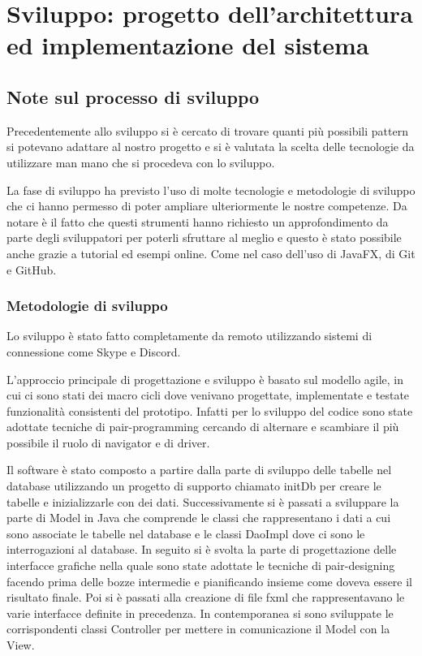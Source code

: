\documentclass{article}
\begin{document}
\newpage
\section{Sviluppo: progetto dell'architettura ed implementazione del sistema}
\subsection{Note sul processo di sviluppo}
Precedentemente allo sviluppo si è cercato di trovare quanti più possibili pattern si potevano adattare al nostro progetto e si è valutata la scelta delle tecnologie da utilizzare man mano che si procedeva con lo sviluppo.

La fase di sviluppo ha previsto l'uso di molte tecnologie e metodologie di sviluppo che ci hanno permesso di poter ampliare ulteriormente le nostre competenze.
Da notare è il fatto che questi strumenti hanno richiesto un approfondimento da parte degli sviluppatori per poterli sfruttare al meglio e questo è stato possibile anche grazie a tutorial ed esempi online. Come nel caso dell'uso di JavaFX, di Git e GitHub.

\subsubsection{Metodologie di sviluppo}
Lo sviluppo è stato fatto completamente da remoto utilizzando sistemi di connessione come Skype e Discord. 

L'approccio principale di progettazione e sviluppo è basato sul modello agile, in cui ci sono stati dei macro cicli dove venivano progettate, implementate e testate funzionalità consistenti del prototipo. 
 Infatti per lo sviluppo del codice sono state adottate tecniche di pair-programming cercando di alternare e scambiare il più possibile il ruolo di navigator e di driver.

Il software è stato composto a partire dalla parte di sviluppo delle tabelle nel database utilizzando un progetto di supporto chiamato initDb per creare le tabelle e inizializzarle con dei dati. Successivamente si è passati a sviluppare la parte di Model in Java che comprende le classi che rappresentano i dati a cui sono associate le tabelle nel database e le classi DaoImpl dove ci sono le interrogazioni al database.  
In seguito si è svolta la parte di progettazione delle interfacce grafiche nella quale sono state adottate le tecniche di pair-designing facendo prima delle bozze intermedie e pianificando insieme come doveva essere il risultato finale.
Poi si è passati alla creazione di file fxml che rappresentavano le varie interfacce definite in precedenza. In contemporanea si sono sviluppate le corrispondenti classi Controller per mettere in comunicazione il Model con la View.
\end{document}
